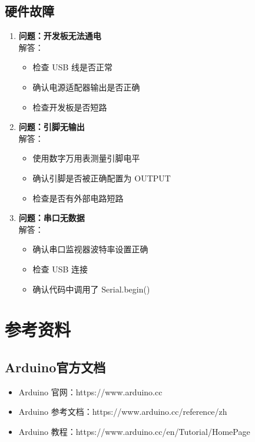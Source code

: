 \documentclass[12pt,UTF8]{ctexbook}
\begin{document}
\section{硬件故障}

\begin{enumerate}
    \item \textbf{问题：开发板无法通电}
    \\解答：
    \begin{itemize}
        \item 检查 USB 线是否正常
        \item 确认电源适配器输出是否正确
        \item 检查开发板是否短路
    \end{itemize}
    
    \item \textbf{问题：引脚无输出}
    \\解答：
    \begin{itemize}
        \item 使用数字万用表测量引脚电平
        \item 确认引脚是否被正确配置为 OUTPUT
        \item 检查是否有外部电路短路
    \end{itemize}
    
    \item \textbf{问题：串口无数据}
    \\解答：
    \begin{itemize}
        \item 确认串口监视器波特率设置正确
        \item 检查 USB 连接
        \item 确认代码中调用了 Serial.begin()
    \end{itemize}
\end{enumerate}

\chapter{参考资料}

\section{Arduino官方文档}

\begin{itemize}
    \item Arduino 官网：https://www.arduino.cc
    \item Arduino 参考文档：https://www.arduino.cc/reference/zh
    \item Arduino 教程：https://www.arduino.cc/en/Tutorial/HomePage
\end{itemize}
\end{document}
